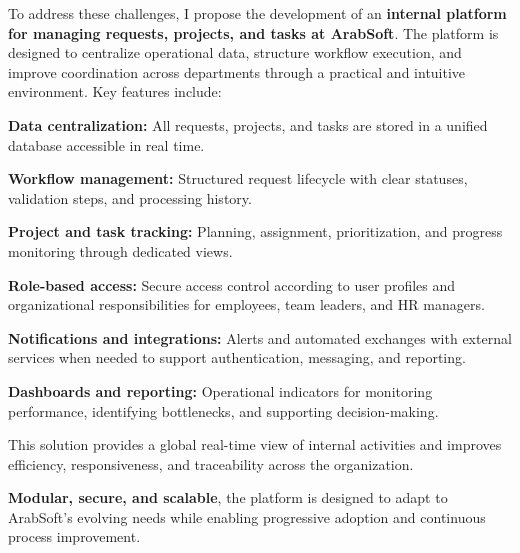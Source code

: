 {\fontsize{12}{18}\selectfont
\setlength{\parindent}{1.2cm}
\setlength{\parskip}{6pt}

\indent To address these challenges, I propose the development of an \textbf{internal platform for managing requests, projects, and tasks at ArabSoft}. The platform is designed to centralize operational data, structure workflow execution, and improve coordination across departments through a practical and intuitive environment. Key features include:

\begin{itemize}[leftmargin=2cm, itemsep=4pt]
  {\fontsize{12}{18}\selectfont
  \item \textbf{Data centralization:} All requests, projects, and tasks are stored in a unified database accessible in real time.
  \item \textbf{Workflow management:} Structured request lifecycle with clear statuses, validation steps, and processing history.
  \item \textbf{Project and task tracking:} Planning, assignment, prioritization, and progress monitoring through dedicated views.
  \item \textbf{Role-based access:} Secure access control according to user profiles and organizational responsibilities for employees, team leaders, and HR managers.
  \item \textbf{Notifications and integrations:} Alerts and automated exchanges with external services when needed to support authentication, messaging, and reporting.
  \item \textbf{Dashboards and reporting:} Operational indicators for monitoring performance, identifying bottlenecks, and supporting decision-making.
  }
\end{itemize}

\indent This solution provides a global real-time view of internal activities and improves efficiency, responsiveness, and traceability across the organization.

\indent \textbf{Modular, secure, and scalable}, the platform is designed to adapt to ArabSoft's evolving needs while enabling progressive adoption and continuous process improvement.

}

\vspace{6pt}


